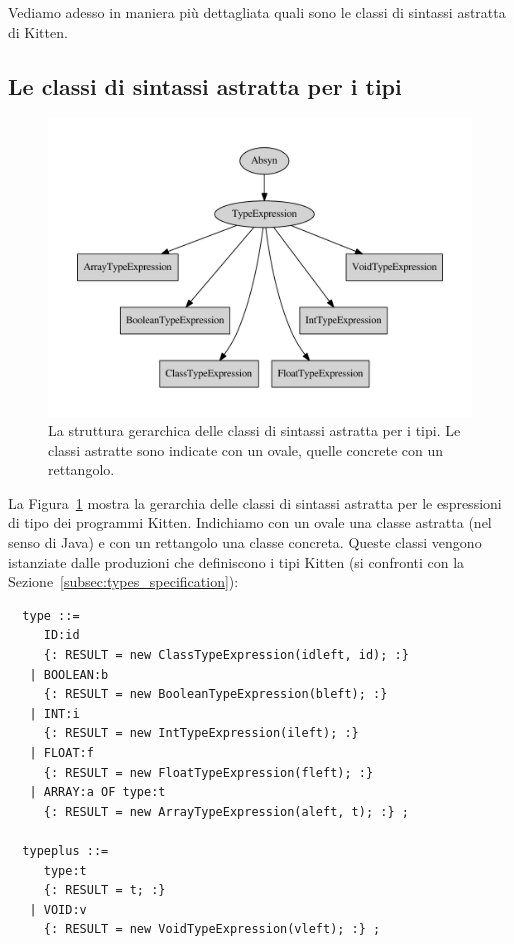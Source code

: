 Vediamo adesso in maniera pi\`u dettagliata quali sono le classi di
sintassi astratta di Kitten.
%
\subsection{Le classi di sintassi astratta per i tipi}
  \label{subsec:types_abstract}
%
\begin{figure}[t]
\begin{center}
\includegraphics[width=14cm]{types_hierarchy.pdf}
\end{center}
\caption{La struttura gerarchica delle classi di sintassi astratta per
         i tipi. Le classi astratte sono indicate con un
         ovale, quelle concrete con un rettangolo.}
  \label{fig:types_hierarchy}
\end{figure}

La Figura~\ref{fig:types_hierarchy} mostra la gerarchia delle classi di
sintassi astratta per le espressioni di tipo dei programmi Kitten.
Indichiamo con un ovale una classe astratta (nel senso di Java) e con
un rettangolo una classe concreta. Queste classi vengono istanziate
dalle produzioni che definiscono i tipi Kitten
(si confronti con la Sezione~\ref{subsec:types_specification}):
%
\begin{verbatim}
  type ::=
     ID:id
     {: RESULT = new ClassTypeExpression(idleft, id); :}
   | BOOLEAN:b
     {: RESULT = new BooleanTypeExpression(bleft); :}
   | INT:i
     {: RESULT = new IntTypeExpression(ileft); :}
   | FLOAT:f
     {: RESULT = new FloatTypeExpression(fleft); :}
   | ARRAY:a OF type:t
     {: RESULT = new ArrayTypeExpression(aleft, t); :} ;

  typeplus ::=
     type:t
     {: RESULT = t; :}
   | VOID:v
     {: RESULT = new VoidTypeExpression(vleft); :} ;
\end{verbatim}

